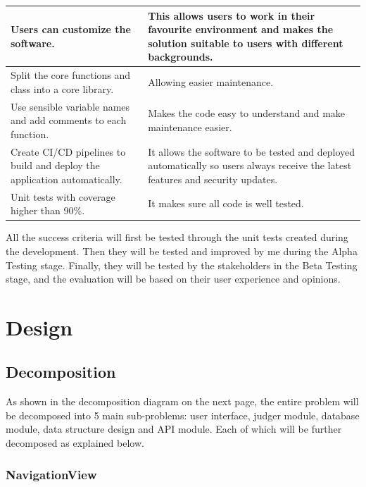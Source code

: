 \documentclass[a4paper]{report}
\begin{document}
\begin{tabulary}{\linewidth}{|L|L|}
    \hline
    Users can customize the software. & This allows users to work in their favourite environment and makes the solution suitable to users with different backgrounds.\\
    \hline
    Split the core functions and class into a core library. & Allowing easier maintenance. \\
    \hline
    Use sensible variable names and add comments to each function. & Makes the code easy to understand and make maintenance easier.\\
    \hline
    Create CI/CD pipelines to build and deploy the application automatically. & It allows the software to be tested and deployed automatically so users always receive the latest features and security updates.\\
    \hline
    Unit tests with coverage higher than 90\%. & It makes sure all code is well tested. \\
    \hline
\end{tabulary}

All the success criteria will first be tested through the unit tests created during the development. Then they will be tested and improved by me during the Alpha Testing stage. Finally, they will be tested by the stakeholders in the Beta Testing stage, and the evaluation will be based on their user experience and opinions.

\chapter{Design}
\section{Decomposition}

As shown in the decomposition diagram on the next page, the entire problem will be decomposed into 5 main sub-problems: user interface, judger module, database module, data structure design and API module. Each of which will be further decomposed as explained below.



\subsection{NavigationView}
\end{document}
